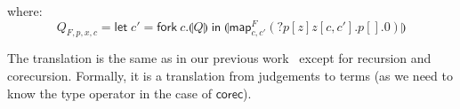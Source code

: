 \documentclass[orivec,envcountsame]{llncs}
\newcommand{\cpdual}[1]{#1^\perp}
\newcommand{\gvdual}[1]{\overline{#1}}
\newcommand{\gvout}[2]{{!#1.#2}}
\newcommand{\outterm}{\mathrm{end}_!}
\newcommand{\gvservice}[1]{\sharp #1}
\newcommand{\cptyp}[2]{#1 \vdash #2}
\newcommand{\gvtyp}[3]{#1 \vdash #2 : #3}
\newcommand{\mapname}{\mathsf{map}}
\newcommand{\map}[3]{\mapname^{#1}_{#2}(#3)}
\newcommand{\gvmap}[3]{\mapname^{#1}_{#2}\:#3}
\newcommand{\mkwd}[1]{\mathsf{#1}}
\newcommand{\derelict}[2]{{?#1[#2]}}
\newcommand{\gvsend}[2]{\mkwd{send}\:#1\:#2}
\newcommand{\gvlet}[3]{\mkwd{let}\;#1 = #2\;\mkwd{in}\;#3}
\newcommand{\gvfork}[2]{\mkwd{fork}\:#1.#2}
\newcommand{\gvrequest}[1]{\mkwd{request}\:#1}
\newcommand{\key}{\mkwd}
\newcommand{\togv}[1]{\llparenthesis #1 \rrparenthesis}
\newcommand{\mucp}{$\mu\mathrm{CP}$\xspace}
\newcommand{\mugv}{$\mu\mathrm{GV}$\xspace}
\newcommand{\todo}[1]{{\noindent\small\color{red} \framebox{\parbox{\dimexpr\linewidth-2\fboxsep-2\fboxrule}{\textbf{TODO:} #1}}}}
\begin{document}
where:
%
\[
  Q_{F,p,x,c} =
    \gvlet{c'}{\gvfork{c}{\togv{Q}}}
          {\togv{\map{F}{c,c'}{\derelict{p}{z}{z[c, c'].p[].0}}}}
\]%


The translation is the same as in our previous work~\cite{LindleyM14} except for recursion and
corecursion. Formally, it is a translation from judgements to terms (as we need to know the type
operator in the case of $\key{corec}$).








\end{document}
